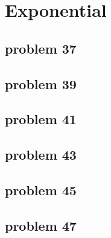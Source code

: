 \section{Exponential}

\subsection{problem 37}

\subsection{problem 39}

\subsection{problem 41}

\subsection{problem 43}

\subsection{problem 45}

\subsection{problem 47}

